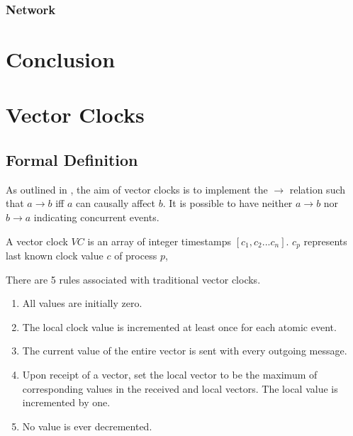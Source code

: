\documentclass[12pt,a4paper,twoside,openright]{report}
\begin{document}
		\subsection{Network}
		
		
		
		
		
		


\chapter{Conclusion}



\printbibliography

\appendix

\chapter{Vector Clocks}

\section{Formal Definition}
\label{appendix:vectorclocks}

As outlined in \cite{fidge1987}, the aim of vector clocks is to implement the $\rightarrow$ relation such that $ a \rightarrow b$ iff $a$ can causally affect $b$. It is possible to have neither $a \rightarrow b$ nor $b \rightarrow a$ indicating concurrent events.

A vector clock $VC$ is an array of integer timestamps $[c_1, c_2...c_n]$. $c_p$ represents last known clock value $c$ of process $p$, 

There are 5 rules associated with traditional vector clocks.
\begin{enumerate}
	\item All values are initially zero.
	\item The local clock value is incremented at least once for each atomic event.
	\item The current value of the entire vector is sent with every outgoing message.
	\item Upon receipt of a vector, set the local vector to be the maximum of corresponding values in the received and local vectors. The local value is incremented by one.
	\item No value is ever decremented.
\end{enumerate}
\end{document}
